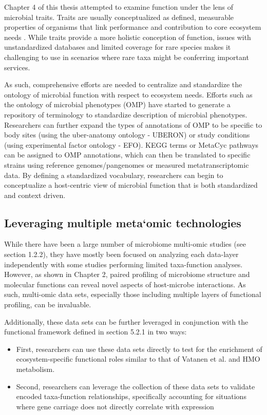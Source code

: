 Chapter 4 of this thesis attempted to examine function under the lens of microbial traits. Traits are usually conceptualized as defined, measurable properties of organisms that link performance and contribution to core ecosystem needs \cite{krause2014traitbased}. While traits provide a more holistic conception of function, issues with unstandardized databases \cite{madin2020synthesis} and limited coverage for rare species makes it challenging to use in scenarios where rare taxa might be conferring important services.  

As such, comprehensive efforts are needed to centralize and standardize the ontology of microbial function with respect to ecosystem needs. Efforts such as the ontology of microbial phenotypes (OMP) \cite{chibucos2014ontology} have started to generate a repository of terminology to standardize description of microbial phenotypes. Researchers can further expand the types of annotations of OMP to be specific to body sites (using the uber-anatomy ontology - UBERON) or study conditions (using experimental factor ontology - EFO). KEGG terms or MetaCyc pathways can be assigned to OMP annotations, which can then be translated to specific strains using reference genomes/pangenomes or measured metatranscriptomic data. By defining a standardized vocabulary, researchers can begin to conceptualize a host-centric view of microbial function that is both standardized and context driven. 

\subsection{Leveraging multiple meta`omic technologies}

While there have been a large number of microbiome multi-omic studies (see section 1.2.2), they have mostly been focused on analyzing each data-layer independently with some studies performing limited taxa-function analyses. However, as shown in Chapter 2, paired profiling of microbiome structure and molecular functions can reveal novel aspects of host-microbe interactions. As such, multi-omic data sets, especially those including multiple layers of functional profiling, can be invaluable. 

Additionally, these data sets can be further leveraged in conjunction with the functional framework defined in section 5.2.1 in two ways: 

\begin{itemize}
    \item First, researchers can use these data sets directly to test for the enrichment of ecosystem-specific functional roles similar to that of Vatanen et al. \cite{vatanen2018human} and HMO metabolism. 
    \item Second, researchers can leverage the collection of these data sets to validate encoded taxa-function relationships, specifically accounting for situations where gene carriage does not directly correlate with expression \cite{franzosa2014relating}
\end{itemize}

